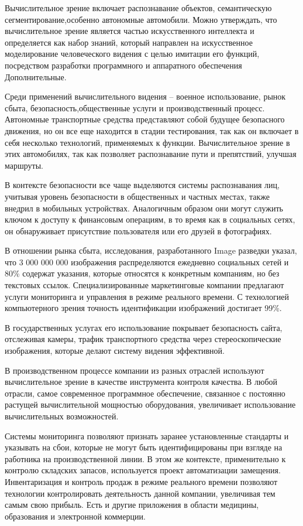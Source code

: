  Вычислительное зрение включает распознавание объектов, семантическую сегментирование,особенно автономные автомобили.
 Можно утверждать, что вычислительное зрение является частью искусственного интеллекта и определяется как набор знаний, 
 который направлен на искусственное моделирование человеческого видения с целью имитации его функций, 
 посредством разработки программного и аппаратного обеспечения Дополнительные.

 Среди применений вычислительного видения – военное использование, рынок сбыта, безопасность,общественные услуги и производственный процесс. 
 Автономные транспортные средства представляют собой будущее безопасного движения, но он все еще находится в стадии тестирования, 
 так как он включает в себя несколько технологий, применяемых к функции. Вычислительное зрение в этих автомобилях,
 так как позволяет распознавание пути и препятствий, улучшая маршруты.

 В контексте безопасности все чаще выделяются системы распознавания лиц,
 учитывая уровень безопасности в общественных и частных местах, 
 также внедрил в мобильных устройствах.
 Аналогичным образом они могут служить ключом к доступу к финансовым операциям,
 в то время как в социальных сетях, он обнаруживает присутствие пользователя или его друзей в фотографиях. 

 В отношении рынка сбыта, исследования, разработанного Image разведки указал,
 что 3 000 000 000 изображения распределяются ежедневно социальных сетей и 80\% 
 содержат указания, которые относятся к конкретным компаниям, но без текстовых ссылок.
 Специализированные маркетинговые компании предлагают услуги мониторинга и управления в режиме реального времени. 
 С технологией компьютерного зрения точность идентификации изображений достигает 99\%.

 В государственных услугах его использование покрывает безопасность сайта, отслеживая камеры, 
 трафик транспортного средства через стереоскопические изображения, 
 которые делают систему видения эффективной.

 В производственном процессе компании из разных отраслей используют 
 вычислительное зрение в качестве инструмента контроля качества.
 В любой отрасли, самое современное программное обеспечение,
 связанное с постоянно растущей вычислительной мощностью оборудования,
 увеличивает использование вычислительных возможностей. 

 Системы мониторинга позволяют признать заранее установленные стандарты и указывать на сбои, которые не могут быть идентифицированы при взгляде на работника на производственной линии.
 В этом же контексте, применительно к контролю складских запасов, используется проект автоматизации замещения.
 Инвентаризация и контроль продаж в режиме реального времени позволяют технологии контролировать деятельность данной компании, 
 увеличивая тем самым свою прибыль. Есть и другие приложения в области медицины, образования и электронной коммерции.